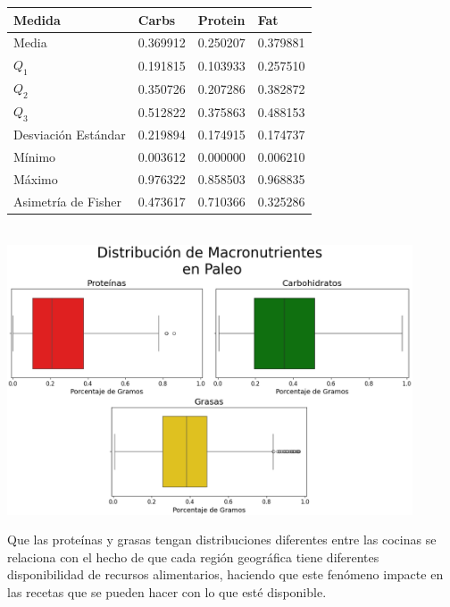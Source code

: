 \documentclass[12pt,a4paper]{article}
\begin{document}
{{            \begin{center}
                \begin{tabular}{l|lll}
                    \toprule
                        Medida & Carbs & Protein & Fat \\
                    \midrule
                        Media               & 0.369912 & 0.250207 & 0.379881 \\
                        $Q_1$               & 0.191815 & 0.103933 & 0.257510 \\
                        $Q_2$               & 0.350726 & 0.207286 & 0.382872 \\
                        $Q_3$               & 0.512822 & 0.375863 & 0.488153 \\
                        Desviación Estándar & 0.219894 & 0.174915 & 0.174737 \\
                        Mínimo              & 0.003612 & 0.000000 & 0.006210 \\
                        Máximo              & 0.976322 & 0.858503 & 0.968835 \\
                        Asimetría de Fisher & 0.473617 & 0.710366 & 0.325286 \\
                    \bottomrule
                \end{tabular}\\
                \vspace{0.5cm}
                \includegraphics[width=0.9\textwidth]{Resources/EDA/Paleo_1.png}
            \end{center}       

            Que las proteínas y grasas tengan distribuciones diferentes entre 
            las cocinas se relaciona con el hecho de que cada región geográfica 
            tiene diferentes disponibilidad de recursos alimentarios, haciendo que 
            este fenómeno impacte en las recetas que se pueden hacer con lo que 
            esté disponible.

}}
\end{document}

